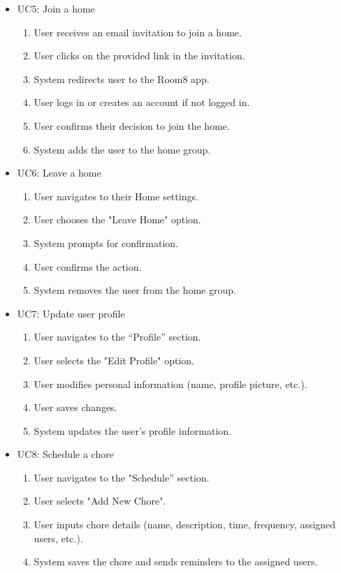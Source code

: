 \documentclass{scrreprt}
\theoremstyle{definition}
\begin{document}
\begin{itemize}
    \item UC5: Join a home
    \begin{enumerate}
        \item User receives an email invitation to join a home.
        \item User clicks on the provided link in the invitation.
        \item System redirects user to the Room8 app.
        \item User logs in or creates an account if not logged in.
        \item User confirms their decision to join the home.
        \item System adds the user to the home group.
    \end{enumerate}
    
    \item UC6: Leave a home
    \begin{enumerate}
        \item User navigates to their Home settings.
        \item User chooses the "Leave Home" option.
        \item System prompts for confirmation.
        \item User confirms the action.
        \item System removes the user from the home group.
    \end{enumerate}
    
    \item UC7: Update user profile
    \begin{enumerate}
        \item User navigates to the “Profile” section.
        \item User selects the "Edit Profile" option.
        \item User modifies personal information (name, profile picture, etc.).
        \item User saves changes.
        \item System updates the user’s profile information.
    \end{enumerate}
    
    \item UC8: Schedule a chore
    \begin{enumerate}
        \item User navigates to the "Schedule” section.
        \item User selects "Add New Chore".
        \item User inputs chore details (name, description, time, frequency, assigned users, etc.).
        \item System saves the chore and sends reminders to the assigned users.
    \end{enumerate}
    

\end{itemize}
\end{document}
